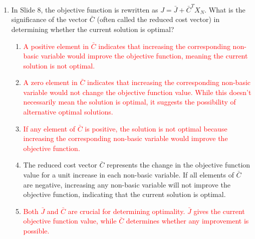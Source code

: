 \documentclass{article}%
\newcommand{\incorrect}[1]{\textcolor{red}{#1}}
\begin{document}
\begin{enumerate}
\begin{enumerate}
\item The partitioning is crucial because at each iteration of the simplex method, the non-basic variables are set to zero, simplifying the constraints to a system of $m$ equations in $m$ unknowns (the basic variables). This allows for easy calculation of the basic variable values and the objective function value at each vertex of the feasible region.%
\item \incorrect{The partitioning doesn't directly simplify the graphical representation; it simplifies the algebraic representation used in the simplex algorithm.}%
\item \incorrect{The partitioning is fundamental to the simplex algorithm's efficiency and is not merely a notational convenience.}%
\end{enumerate}%
\vspace{1em}%
\item In Slide 8, the objective function is rewritten as $J = \bar{J} + \bar{C}^T X_N$. What is the significance of the vector $\bar{C}$ (often called the reduced cost vector) in determining whether the current solution is optimal?%
\begin{enumerate}%
\item \incorrect{A positive element in $\bar{C}$ indicates that increasing the corresponding non-basic variable would improve the objective function, meaning the current solution is not optimal.}%
\item \incorrect{A zero element in $\bar{C}$ indicates that increasing the corresponding non-basic variable would not change the objective function value.  While this doesn't necessarily mean the solution is optimal, it suggests the possibility of alternative optimal solutions.}%
\item \incorrect{If any element of $\bar{C}$ is positive, the solution is not optimal because increasing the corresponding non-basic variable would improve the objective function.}%
\item The reduced cost vector $\bar{C}$ represents the change in the objective function value for a unit increase in each non-basic variable. If all elements of $\bar{C}$ are negative, increasing any non-basic variable will not improve the objective function, indicating that the current solution is optimal.%
\item \incorrect{Both $\bar{J}$ and $\bar{C}$ are crucial for determining optimality. $\bar{J}$ gives the current objective function value, while $\bar{C}$ determines whether any improvement is possible.}%
\end{enumerate}%

\end{enumerate}
\end{document}
